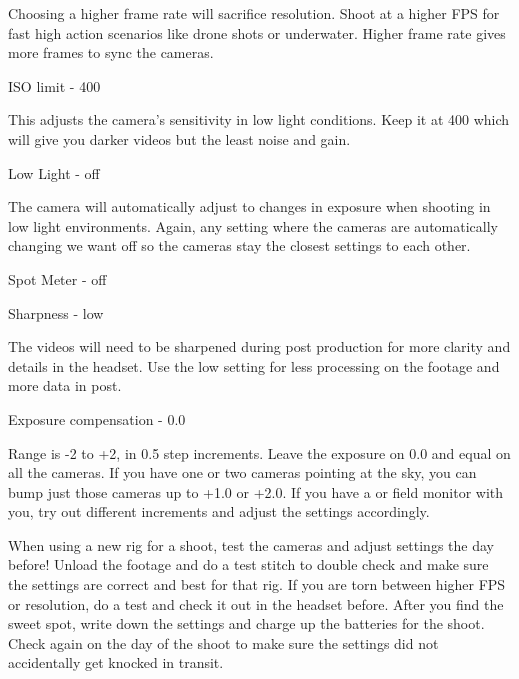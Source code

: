 \begin{fullwidth}

Choosing a higher frame rate will sacrifice resolution. Shoot at a higher FPS for fast high action scenarios like drone shots or underwater. Higher frame rate gives more frames to sync the cameras.

{\large ISO limit - 400 \par}


This adjusts the camera’s sensitivity in low light conditions. Keep it at 400 which will give you darker videos but the least noise and gain. 

\clearpage
{\large Low Light - off \par}


The camera will automatically adjust to changes in exposure when shooting in low light environments. Again, any setting where the cameras are automatically changing we want off so the cameras stay the closest settings to each other. 

{\large Spot Meter - off \par}


\clearpage
{\large Sharpness - low \par}


The videos will need to be sharpened during post production for more clarity and details in the headset. Use the low setting for less processing on the footage and more data in post. 

{\large Exposure compensation - 0.0 \par} 


Range is -2 to +2, in 0.5 step increments. Leave the exposure on 0.0 and equal on all the cameras. If you have one or two cameras pointing at the sky, you can bump just those cameras up to +1.0 or +2.0. If you have a \textbf{} or field monitor with you, try out different increments and adjust the settings accordingly. 

\tip When using a new rig for a shoot, test the cameras and adjust settings the day before! Unload the footage and do a test stitch to double check and make sure the settings are correct and best for that rig. If you are torn between higher FPS or resolution, do a test and check it out in the headset before. After you find the sweet spot, write down the settings and charge up the batteries for the shoot. Check again on the day of the shoot to make sure the settings did not accidentally get knocked in transit. 

\clearpage
\end{fullwidth}
